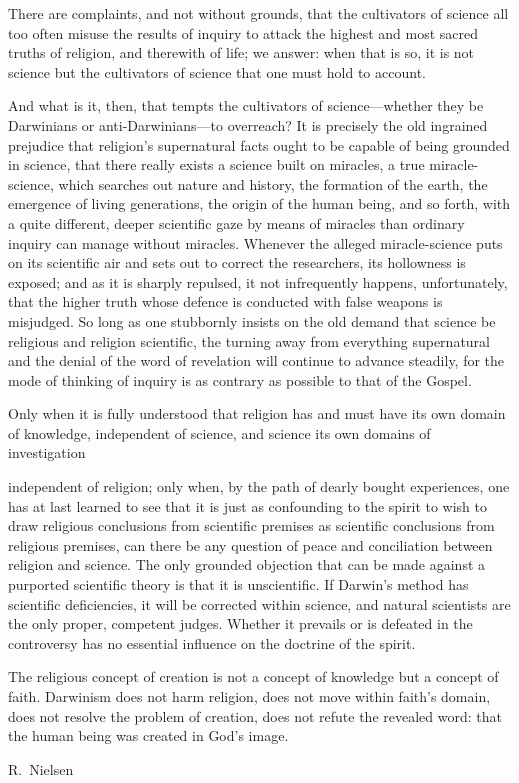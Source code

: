 \documentclass[12pt,a4paper]{article}
\begin{document}
There are complaints, and not without grounds, that the cultivators of
science all too often misuse the results of inquiry to attack the
highest and most sacred truths of religion, and therewith of life; we
answer: when that is so, it is not science but the cultivators of
science that one must hold to account.

And what is it, then, that tempts the cultivators of science---whether
they be Darwinians or anti-Darwinians---to overreach? It is precisely
the old ingrained prejudice that religion's supernatural facts ought
to be capable of being grounded in science, that there really exists a
science built on miracles, a true miracle-science, which searches out
nature and history, the formation of the earth, the emergence of
living generations, the origin of the human being, and so forth, with
a quite different, deeper scientific gaze by means of miracles than
ordinary inquiry can manage without miracles. Whenever the alleged
miracle-science puts on its scientific air and sets out to correct the
researchers, its hollowness is exposed; and as it is sharply repulsed,
it not infrequently happens, unfortunately, that the higher truth
whose defence is conducted with false weapons is misjudged. So long
as one stubbornly insists on the old demand that science be religious
and religion scientific, the turning away from everything supernatural
and the denial of the word of revelation will continue to advance
steadily, for the mode of thinking of inquiry is as contrary as
possible to that of the Gospel.

Only when it is fully understood that religion has and must have its
own domain of knowledge, independent of science, and science its own
domains of investigation

independent of religion; only when, by the path of dearly bought
experiences, one has at last learned to see that it is just as
confounding to the spirit to wish to draw religious conclusions from
scientific premises as scientific conclusions from religious premises,
can there be any question of peace and conciliation between religion
and science. The only grounded objection that can be made against a
purported scientific theory is that it is unscientific. If Darwin's
method has scientific deficiencies, it will be corrected within
science, and natural scientists are the only proper, competent judges.
Whether it prevails or is defeated in the controversy has no essential
influence on the doctrine of the spirit.

The religious concept of creation is not a concept of knowledge but a
concept of faith. Darwinism does not harm religion, does not move
within faith's domain, does not resolve the problem of creation, does
not refute the revealed word: that the human being was created in
God's image.

\medskip
\begin{flushright}
R.\ Nielsen
\end{flushright}
\end{document}
